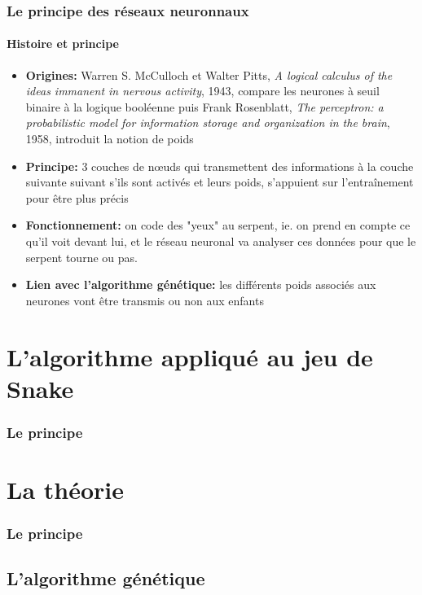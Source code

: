 \documentclass[10pt]{beamer}
\begin{document}
\begin{frame}
  \frametitle{Le principe des réseaux neuronnaux}
  \framesubtitle{Histoire et principe}
  
  \begin{itemize}
    
    \item \textbf{Origines:} Warren S. McCulloch et Walter Pitts, \textit{A logical calculus of the ideas immanent in nervous activity}, 1943, compare les neurones à seuil binaire à la logique booléenne puis Frank Rosenblatt, \textit{The perceptron: a probabilistic model for information storage and organization in the brain}, 1958, introduit la notion de poids
    
    \item \textbf{Principe:} 3 couches de n\oe uds qui transmettent des informations à la couche suivante suivant s'ils sont activés et leurs poids, s'appuient sur l'entraînement pour être plus précis
    
    \item \textbf{Fonctionnement:} on code des "yeux" au serpent, ie. on prend en compte ce qu'il voit devant lui, et le réseau neuronal va analyser ces données pour que le serpent tourne ou pas.
    
    \item \textbf{Lien avec l'algorithme génétique:} les différents poids associés aux neurones vont être transmis ou non aux enfants

  \end{itemize}

  \end{frame}

\section{L'algorithme appliqué au jeu de Snake}

\begin{frame}
  \frametitle{Le principe}
  \end{frame}

\section{La théorie}

\begin{frame}
  \frametitle{Le principe}
  \end{frame}

\subsection{L'algorithme génétique}
\end{document}
